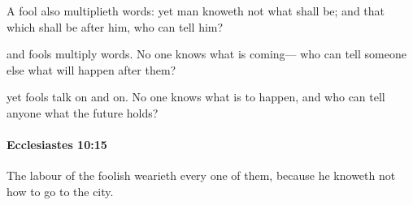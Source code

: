 			\begin{versebox}
					\item[BHS] 
					\item[LXX] 
					\item[ASV] A fool also multiplieth words: yet man knoweth not what shall be; and that which shall be after him, who can tell him?
					\item[NIV] and fools multiply words. No one knows what is coming— who can tell someone else what will happen after them?
					\item[NRSV] yet fools talk on and on. No one knows what is to happen, and who can tell anyone what the future holds?
			\end{versebox}

		\paragraph{Ecclesiastes 10:15} %
			\label{ECCLESIASTES-10-15}

			The labour of the foolish wearieth every one of them, because he knoweth not how to go to the city.

